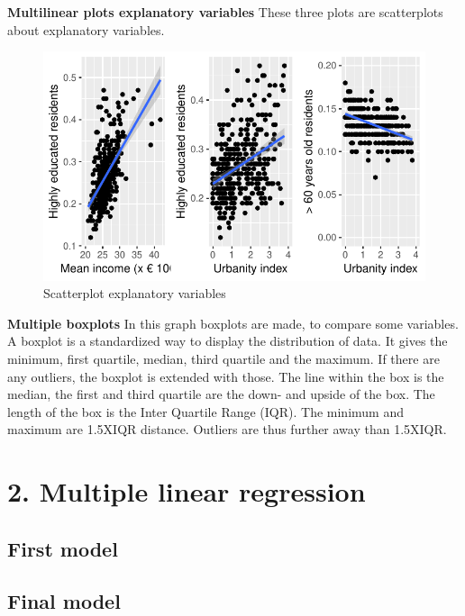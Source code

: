 \documentclass[11pt,]{article}
\begin{document}
\textbf{Multilinear plots explanatory variables} These three plots are
scatterplots about explanatory variables.

\begin{figure}[H]

{\centering \includegraphics{Report_files/figure-latex/unnamed-chunk-7-1} 

}

\caption{\label{5}Scatterplot explanatory variables}\label{fig:unnamed-chunk-7}
\end{figure}

\textbf{Multiple boxplots} In this graph boxplots are made, to compare
some variables. A boxplot is a standardized way to display the
distribution of data. It gives the minimum, first quartile, median,
third quartile and the maximum. If there are any outliers, the boxplot
is extended with those. The line within the box is the median, the first
and third quartile are the down- and upside of the box. The length of
the box is the Inter Quartile Range (IQR). The minimum and maximum are
1.5XIQR distance. Outliers are thus further away than 1.5XIQR.

\section{2. Multiple linear
regression}\label{multiple-linear-regression}

\subsection{First model}\label{first-model}

\subsection{Final model}\label{final-model}
\end{document}
